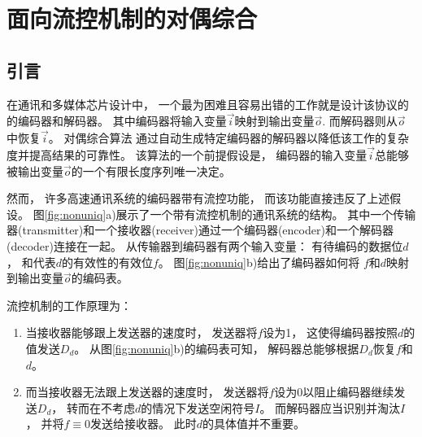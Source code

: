 \chapter{面向流控机制的对偶综合}
\label{chap:6}

%
%

\section{ 引言}

在通讯和多媒体芯片设计中，
一个最为困难且容易出错的工作就是设计该协议的的编码器和解码器。
其中编码器将输入变量$\vec{i}$映射到输出变量$\vec{o}$.
而解码器则从$\vec{o}$中恢复$\vec{i}$。
对偶综合算法
通过自动生成特定编码器的解码器以降低该工作的复杂度并提高结果的可靠性。
该算法的一个前提假设是，
编码器的输入变量$\vec{i}$总能够被输出变量$\vec{o}$的一个有限长度序列唯一决定。

然而，
许多高速通讯系统的编码器带有流控功能，
而该功能直接违反了上述假设。
图\ref{fig:nonuniq}a)展示了一个带有流控机制的通讯系统的结构。
其中一个传输器(transmitter)和一个接收器(receiver)通过一个编码器(encoder)和一个解码器(decoder)连接在一起。
从传输器到编码器有两个输入变量：
有待编码的数据位$d$，
和代表$d$的有效性的有效位$f$。
图\ref{fig:nonuniq}b)给出了编码器如何将
$f$和$d$映射到输出变量$\vec{o}$的编码表。

流控机制的工作原理为：
\begin{enumerate}
\item
当接收器能够跟上发送器的速度时，
发送器将$f$设为1，
这使得编码器按照$d$的值发送$D_d$。
从图\ref{fig:nonuniq}b)的编码表可知，
解码器总能够根据$D_d$恢复$f$和$d$。
\item
而当接收器无法跟上发送器的速度时，
发送器将$f$设为0以阻止编码器继续发送$D_d$，
转而在不考虑$d$的情况下发送空闲符号$I$。
而解码器应当识别并淘汰$I$，
并将$f\equiv 0$发送给接收器。
此时$d$的具体值并不重要。
\end{enumerate}

